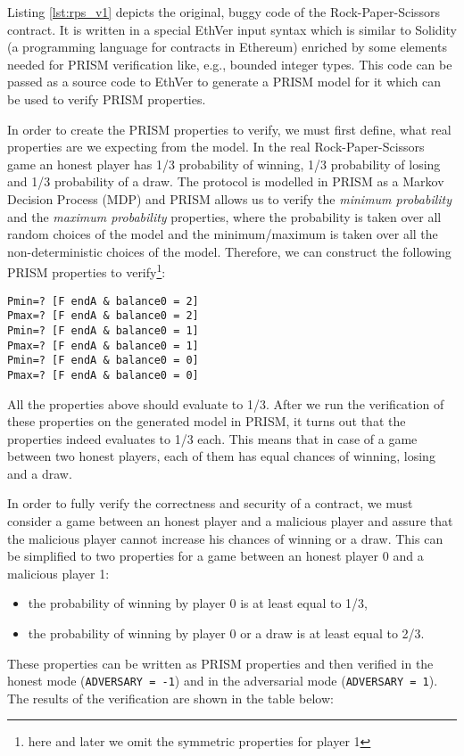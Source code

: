 

Listing \ref{lst:rps_v1} depicts the original, buggy code of the Rock-Paper-Scissors contract.
It is written in a special EthVer input syntax which is similar to Solidity (a programming language for contracts
in Ethereum) enriched by some elements needed for PRISM verification like, e.g., bounded integer types.
This code can be passed as a source code to EthVer to generate a PRISM model for it which can be used
to verify PRISM properties.

In order to create the PRISM properties to verify, we must first define, what real properties are we expecting from
the model.
In the real Rock-Paper-Scissors game an honest player has 1/3 probability of winning, 1/3 probability of losing and
1/3 probability of a draw.
The protocol is modelled in PRISM as a Markov Decision Process (MDP) and PRISM allows us to verify
the \emph{minimum probability} and the \emph{maximum probability} properties, where the probability is taken 
over all random choices of the model and the minimum/maximum is taken over all the non-deterministic choices
of the model.
Therefore, we can construct the following PRISM properties to verify\footnote{here and later we omit the symmetric
properties for player 1}:
\begin{lstlisting}
Pmin=? [F endA & balance0 = 2]
Pmax=? [F endA & balance0 = 2]
Pmin=? [F endA & balance0 = 1]
Pmax=? [F endA & balance0 = 1]
Pmin=? [F endA & balance0 = 0]
Pmax=? [F endA & balance0 = 0]
\end{lstlisting}
All the properties above should evaluate to 1/3.
After we run the verification of these properties on the generated model in PRISM, it turns out that the properties
indeed evaluates to 1/3 each.
This means that in case of a game between two honest players, each of them has equal chances
of winning, losing and a draw.

In order to fully verify the correctness and security of a contract, we must consider a game between an honest
player and a malicious player and assure that the malicious player cannot increase his chances of winning or a draw.
This can be simplified to two properties for a game between an honest player 0 and a malicious player 1:
\begin{itemize}
\item the probability of winning by player 0 is at least equal to 1/3,
\item the probability of winning by player 0 or a draw is at least equal to 2/3.
\end{itemize}
These properties can be written as PRISM properties and then verified in the honest mode 
(\lstinline{ADVERSARY = -1}) and in the adversarial mode (\lstinline{ADVERSARY = 1}).
The results of the verification are shown in the table below:

